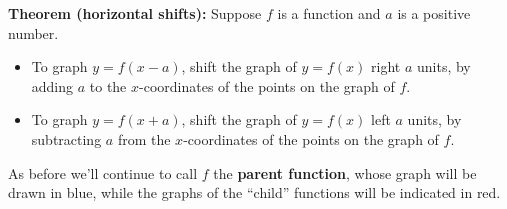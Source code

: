 \documentclass[handout, noauthor, nooutcomes]{ximera}
\begin{document}
\begin{callout}
  {\bf Theorem (horizontal shifts):} Suppose $f$ is a function and $a$ is a positive number.
  \begin{itemize}
  \item To graph $y = f(x-a)$, shift the graph of $y=f(x)$ right $a$ units, by adding $a$ to the $x$-coordinates of the points on the graph of $f$.
      \item To graph $y = f(x+a)$, shift the graph of $y=f(x)$ left $a$ units, by subtracting $a$ from the $x$-coordinates of the points on the graph of $f$.
  \end{itemize}
\end{callout}

As before we'll continue to call $f$ the {\bf parent function}, whose graph will be drawn in blue, while the graphs of the ``child'' functions will be indicated in red.
\end{document}
